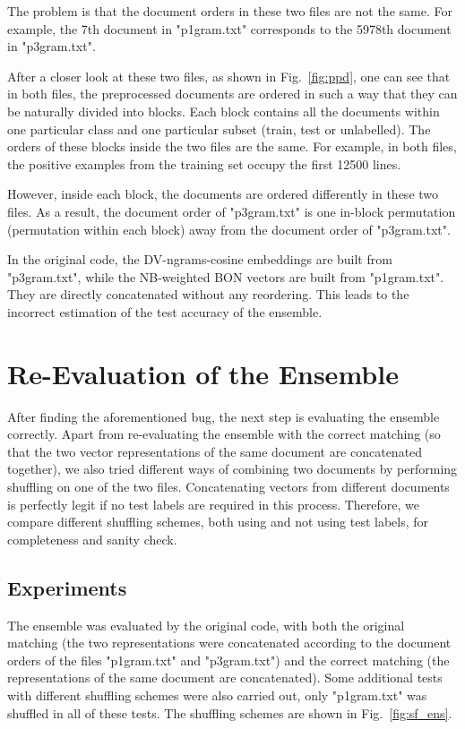 \documentclass[11pt]{article}
\begin{document}
The problem is that the document orders in these two files are not the same. For example, the 7th document in "p1gram.txt" corresponds to the 5978th document in "p3gram.txt".

After a closer look at these two files, as shown in Fig.~\ref{fig:ppd}, one can see that in both files, the preprocessed documents are ordered in such a way that they can be naturally divided into blocks. Each block contains all the documents within one particular class and one particular subset (train, test or unlabelled). The orders of these blocks inside the two files are the same. For example, in both files, the positive examples from the training set occupy the first 12500 lines. 

However, inside each block, the documents are ordered differently in these two files. As a result, the document order of "p3gram.txt" is one in-block permutation (permutation within each block) away from the document order of "p3gram.txt".

In the original code, the DV-ngrams-cosine embeddings are built from "p3gram.txt", while the NB-weighted BON vectors are built from "p1gram.txt". They are directly concatenated without any reordering. This leads to the incorrect estimation of the test accuracy of the ensemble.

\section{Re-Evaluation of the Ensemble}
\label{sec:appendix_reev}
After finding the aforementioned bug, the next step is evaluating the ensemble correctly. Apart from re-evaluating the ensemble with the correct matching (so that the two vector representations of the same document are concatenated together), we also tried different ways of combining two documents by performing shuffling on one of the two files. Concatenating vectors from different documents is perfectly legit if no test labels are required in this process. Therefore, we compare different shuffling schemes, both using and not using test labels, for completeness and sanity check.

\subsection{Experiments}
The ensemble was evaluated by the original code, with both the original matching (the two representations were concatenated according to the document orders of the files "p1gram.txt" and "p3gram.txt") and the correct matching (the representations of the same document are concatenated). Some additional tests with different shuffling schemes were also carried out, only "p1gram.txt" was shuffled in all of these tests. The shuffling schemes are shown in Fig.~\ref{fig:sf_ens}. 
\end{document}
